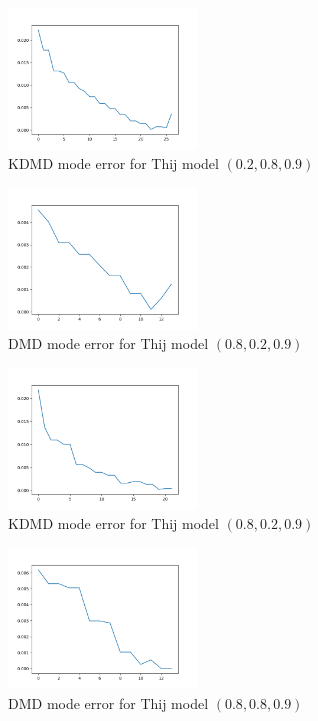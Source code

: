 \begin{figure}
    \includegraphics[width=5cm]{Images/mode_error_kdmd_twitter_020809.png}
    \centering
    \caption{KDMD mode error for Thij model $(0.2,0.8,0.9)$}
\end{figure}


\begin{figure}
    \includegraphics[width=5cm]{Images/mode_error_dmd_twitter_080209.png}
    \centering
    \caption{DMD mode error for Thij model $(0.8,0.2,0.9)$}
\end{figure}


\begin{figure}
    \includegraphics[width=5cm]{Images/mode_error_kdmd_twitter_080209.png}
    \centering
    \caption{KDMD mode error for Thij model $(0.8,0.2,0.9)$}
\end{figure}

\begin{figure}
    \includegraphics[width=5cm]{Images/mode_error_dmd_twitter_080809.png}
    \centering
    \caption{DMD mode error for Thij model $(0.8,0.8,0.9)$}
\end{figure}


